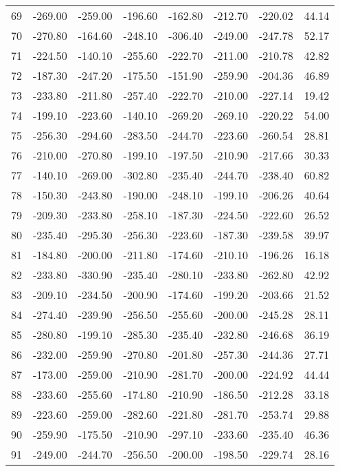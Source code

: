 \begin{longtable}{rrrrrrrr}
69 & -269.00 & -259.00 & -196.60 & -162.80 & -212.70 & -220.02 & 44.14  \\
70 & -270.80 & -164.60 & -248.10 & -306.40 & -249.00 & -247.78 & 52.17  \\
71 & -224.50 & -140.10 & -255.60 & -222.70 & -211.00 & -210.78 & 42.82  \\
72 & -187.30 & -247.20 & -175.50 & -151.90 & -259.90 & -204.36 & 46.89  \\
73 & -233.80 & -211.80 & -257.40 & -222.70 & -210.00 & -227.14 & 19.42  \\
74 & -199.10 & -223.60 & -140.10 & -269.20 & -269.10 & -220.22 & 54.00  \\
75 & -256.30 & -294.60 & -283.50 & -244.70 & -223.60 & -260.54 & 28.81  \\
76 & -210.00 & -270.80 & -199.10 & -197.50 & -210.90 & -217.66 & 30.33  \\
77 & -140.10 & -269.00 & -302.80 & -235.40 & -244.70 & -238.40 & 60.82  \\
78 & -150.30 & -243.80 & -190.00 & -248.10 & -199.10 & -206.26 & 40.64  \\
79 & -209.30 & -233.80 & -258.10 & -187.30 & -224.50 & -222.60 & 26.52  \\
80 & -235.40 & -295.30 & -256.30 & -223.60 & -187.30 & -239.58 & 39.97  \\
81 & -184.80 & -200.00 & -211.80 & -174.60 & -210.10 & -196.26 & 16.18  \\
82 & -233.80 & -330.90 & -235.40 & -280.10 & -233.80 & -262.80 & 42.92  \\
83 & -209.10 & -234.50 & -200.90 & -174.60 & -199.20 & -203.66 & 21.52  \\
84 & -274.40 & -239.90 & -256.50 & -255.60 & -200.00 & -245.28 & 28.11  \\
85 & -280.80 & -199.10 & -285.30 & -235.40 & -232.80 & -246.68 & 36.19  \\
86 & -232.00 & -259.90 & -270.80 & -201.80 & -257.30 & -244.36 & 27.71  \\
87 & -173.00 & -259.00 & -210.90 & -281.70 & -200.00 & -224.92 & 44.44  \\
88 & -233.60 & -255.60 & -174.80 & -210.90 & -186.50 & -212.28 & 33.18  \\
89 & -223.60 & -259.00 & -282.60 & -221.80 & -281.70 & -253.74 & 29.88  \\
90 & -259.90 & -175.50 & -210.90 & -297.10 & -233.60 & -235.40 & 46.36  \\
91 & -249.00 & -244.70 & -256.50 & -200.00 & -198.50 & -229.74 & 28.16  \\

\end{longtable}
